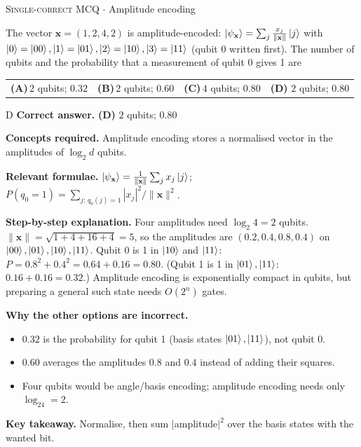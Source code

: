 \documentclass[11pt,a4paper]{article}
\newcommand{\optlabel}[1]{\textbf{(#1)}}
\newcommand{\correctlabel}[1]{\textcolor{okgreen}{\textbf{(#1)}\,\ding{51}}}
\newenvironment{qitem}[1]{\begin{list}{}{\setlength{\leftmargin}{3.3em}\setlength{\labelwidth}{3.1em}%
  \setlength{\labelsep}{0.2em}\setlength{\topsep}{3pt}\setlength{\parsep}{3pt}}\item[\textbf{Q.#1}\hfill]}{\end{list}}
\newcommand{\qsep}{\par\vspace{2pt}{\color{black!15}\hrule}\vspace{4pt}}
\newcommand{\qmeta}[2]{{\footnotesize\color{black!60}\textsc{#1} \;$\cdot$\; #2}\par}
\begin{document}
\begin{qitem}{42}
\qmeta{Single-correct MCQ}{Amplitude encoding}
The vector $\mathbf x = (1, 2, 4, 2)$ is amplitude-encoded: $\ket{\psi_{\mathbf x}} = \sum_j \frac{x_j}{\|\mathbf x\|}\ket j$ with
$\ket0 = \ket{00}, \ket1 = \ket{01}, \ket2 = \ket{10}, \ket3 = \ket{11}$ (qubit 0 written first). The number of qubits and the
probability that a measurement of qubit 0 gives 1 are
\par\smallskip\noindent\begin{tabularx}{\linewidth}{@{}*{4}{L}@{}}
\optlabel{A}\,$2$ qubits; $0.32$ & \optlabel{B}\,$2$ qubits; $0.60$ & \optlabel{C}\,$4$ qubits; $0.80$ & \correctlabel{D}\,$2$ qubits; $0.80$
\end{tabularx}
\end{qitem}
\begin{solbox}{D}
\textbf{\color{brand}Correct answer.} \textcolor{okgreen}{\textbf{(D)}} $2$ qubits; $0.80$

\textbf{\color{brand}Concepts required.} Amplitude encoding stores a normalised vector in the amplitudes of $\log_2d$ qubits.

\textbf{\color{brand}Relevant formulae.} $\ket{\psi_{\mathbf x}} = \frac{1}{\|\mathbf x\|}\sum_jx_j\ket j$; $P(q_0 = 1) = \sum_{j:\,q_0(j) = 1}|x_j|^2/\|\mathbf x\|^2$.

\textbf{\color{brand}Step-by-step explanation.} Four amplitudes need $\log_2 4 = 2$ qubits. $\|\mathbf x\| = \sqrt{1 + 4 + 16 + 4} = 5$, so the amplitudes are
$(0.2, 0.4, 0.8, 0.4)$ on $\ket{00}, \ket{01}, \ket{10}, \ket{11}$. Qubit 0 is 1 in $\ket{10}$ and $\ket{11}$:
$P = 0.8^2 + 0.4^2 = 0.64 + 0.16 = 0.80$. (Qubit 1 is 1 in $\ket{01}, \ket{11}$: $0.16 + 0.16 = 0.32$.) Amplitude encoding is
exponentially compact in qubits, but preparing a general such state needs $O(2^n)$ gates.

\textbf{\color{brand}Why the other options are incorrect.}
\begin{itemize}[leftmargin=2.4em, itemsep=1pt, topsep=2pt]
\item[\textbf{(A)}] $0.32$ is the probability for qubit 1 (basis states $\ket{01}, \ket{11}$), not qubit 0.
\item[\textbf{(B)}] $0.60$ averages the amplitudes $0.8$ and $0.4$ instead of adding their squares.
\item[\textbf{(C)}] Four qubits would be angle/basis encoding; amplitude encoding needs only $\log_24 = 2$.
\end{itemize}
\textbf{\color{brand}Key takeaway.} Normalise, then sum $|$amplitude$|^2$ over the basis states with the wanted bit.
\end{solbox}
\qsep
\end{document}
